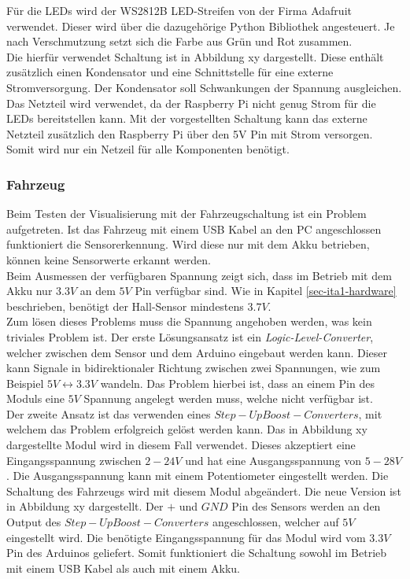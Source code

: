 \documentclass[.../Dokumentation.tex]{subfiles}
\begin{document}
    Für die LEDs wird der WS2812B LED-Streifen von der Firma Adafruit verwendet. Dieser wird über die dazugehörige Python Bibliothek angesteuert. Je nach Verschmutzung setzt sich die Farbe aus Grün und Rot zusammen.\\
    Die hierfür verwendet Schaltung ist in Abbildung xy dargestellt. 
   	Diese enthält zusätzlich einen Kondensator und eine Schnittstelle für eine externe Stromversorgung. Der Kondensator soll Schwankungen der Spannung ausgleichen. Das Netzteil wird verwendet, da der Raspberry Pi nicht genug Strom für die LEDs bereitstellen kann. Mit der vorgestellten Schaltung kann das externe Netzteil zusätzlich den Raspberry Pi über den 5V Pin mit Strom versorgen. Somit wird nur ein Netzeil für alle Komponenten  benötigt.
   	
   	\subsubsection*{Fahrzeug}
   	Beim Testen der Visualisierung mit der Fahrzeugschaltung ist ein Problem aufgetreten. Ist das Fahrzeug mit einem USB Kabel an den PC angeschlossen funktioniert die Sensorerkennung. Wird diese nur mit dem Akku betrieben, können keine Sensorwerte erkannt werden.\\
   	Beim Ausmessen der verfügbaren Spannung zeigt sich, dass im Betrieb mit dem Akku nur $3.3V$ an dem $5V$ Pin verfügbar sind. Wie in Kapitel \ref{sec-ita1-hardware} beschrieben, benötigt der Hall-Sensor mindestens $3.7V$.\\
   	Zum lösen dieses Problems muss die Spannung angehoben werden, was kein triviales Problem ist. Der erste Lösungsansatz ist ein \emph{Logic-Level-Converter}, welcher zwischen dem Sensor und dem Arduino eingebaut werden kann. Dieser kann Signale in bidirektionaler Richtung zwischen zwei Spannungen, wie zum Beispiel $5V \longleftrightarrow 3.3V$ wandeln. Das Problem hierbei ist, dass an einem Pin des Moduls eine $5V$ Spannung angelegt werden muss, welche nicht verfügbar ist.\\
   	Der zweite Ansatz ist das verwenden eines $Step-Up Boost-Converters$, mit welchem das Problem erfolgreich gelöst werden kann. Das in Abbildung xy dargestellte Modul wird in diesem Fall verwendet.   	%
   	Dieses akzeptiert eine Eingangsspannung zwischen $2-24V$ und hat eine Ausgangsspannung von $5-28V$. Die Ausgangsspannung kann mit einem Potentiometer eingestellt werden. Die Schaltung des Fahrzeugs wird mit diesem Modul abgeändert. Die neue Version ist in Abbildung xy dargestellt. %
   	Der $+$ und $GND$ Pin des Sensors werden an den Output des $Step-Up Boost-Converters$ angeschlossen, welcher auf $5V$ eingestellt wird. Die benötigte Eingangsspannung für das Modul wird vom $3.3V$ Pin des Arduinos geliefert. Somit funktioniert die Schaltung sowohl im Betrieb mit einem USB Kabel als auch mit einem Akku. 
    
    
\end{document}
